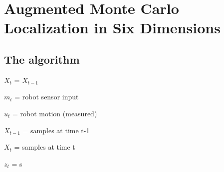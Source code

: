 \documentclass[Thesis.tex]{subfiles}
\begin{document}
\chapter{Augmented Monte Carlo Localization in Six Dimensions}

\section{The algorithm}

\begin{algorithm}


\BlankLine


\BlankLine

$X_t$ = $X_{t-1}$\;


\end{algorithm}

$m_{t}$ = robot sensor input

$u_{t}$ = robot motion (measured)

$X_{t-1}$ = samples at time t-1

$X_{t}$ = samples at time t

$z_{t}$ = s
\end{document}
